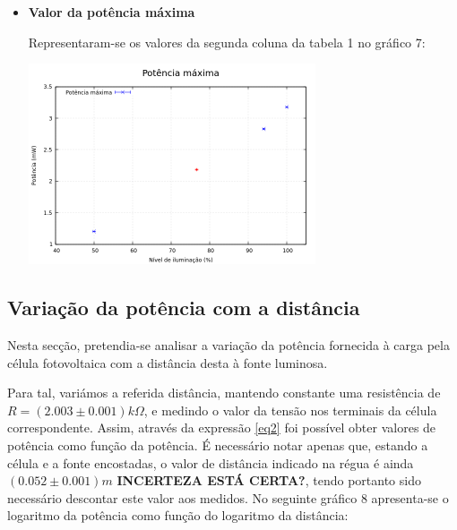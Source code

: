 \documentclass[9pt]{extarticle}
\begin{document}
\begin{multicols}{2}
\begin{itemize}
\item \textbf{Valor da potência máxima}

\par Representaram-se os valores da segunda coluna da tabela 1 no gráfico 7:

\begin{center}
\includegraphics[width=240pt]{Pmax}
\par{}
\end{center}

\end{itemize}

\subsection*{Variação da potência com a distância}

\par Nesta secção, pretendia-se analisar a variação da potência fornecida à carga pela célula fotovoltaica com a distância desta à fonte luminosa.

\par Para tal, variámos a referida distância, mantendo constante uma resistência de $R=(2.003\pm0.001)k\Omega$, e medindo o valor da tensão nos terminais da célula correspondente. Assim, através da expressão \eqref{eq2} foi possível obter valores de potência como função da potência. É necessário notar apenas que, estando a célula e a fonte encostadas, o valor de distância indicado na régua é ainda $(0.052\pm0.001)m$ {\bf INCERTEZA ESTÁ CERTA?}, tendo portanto sido necessário descontar este valor aos medidos. No seguinte gráfico 8 apresenta-se o logaritmo da potência como função do logaritmo da distância:

\begin{center}
\par{}
\end{center}


\end{multicols}
\end{document}
